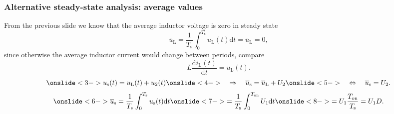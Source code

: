\begin{frame}
    \frametitle{Alternative steady-state analysis: average values}
    From the previous slide we know that the average inductor voltage is zero in steady state
    \begin{equation}
        \overline{u}_\mathrm{L} = \frac{1}{T_\mathrm{s}} \int_{0}^{T_\mathrm{s}} u_\mathrm{L}(t) \mathrm{d}t = \overline{u}_\mathrm{L} = 0,
    \end{equation}%
    \pause%
    since otherwise the average inductor current would change between periods, compare
    $$
    L \frac{\mathrm{d}i_\mathrm{L}(t)}{\mathrm{d}t} =  u_\mathrm{L}(t).
    $$%
    \pause%
    \begin{equation}
        \onslide<3->{u_\mathrm{s}(t) = u_\mathrm{L}(t) + u_2(t)} \onslide<4->{\quad \Rightarrow \quad \overline{u}_\mathrm{s} = \overline{u}_\mathrm{L} + U_2} \onslide<5->{\quad \Leftrightarrow \quad  \overline{u}_\mathrm{s} = U_2.}
        \label{eq:Kirchhoff-switch-voltage}
    \end{equation}
    \begin{equation}
        \onslide<6->{\overline{u}_\mathrm{s} = \frac{1}{T_\mathrm{s}} \int_{0}^{T_\mathrm{s}} u_\mathrm{s}(t) \mathrm{d}t} \onslide<7->{= \frac{1}{T_\mathrm{s}} \int_{0}^{T_\mathrm{on}} U_1 \mathrm{d}t}\onslide<8->{ = U_1 \frac{T_\mathrm{on}}{T_\mathrm{s}} = U_1 D.}
        \label{eq:average-switch-voltage}
    \end{equation}
  
\end{frame}

